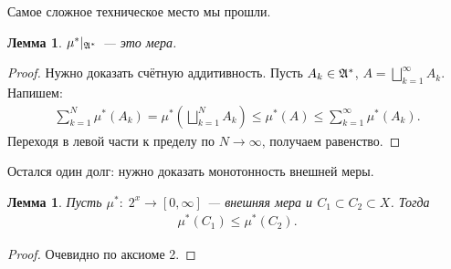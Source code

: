 \documentclass[a4paper,14pt]{extarticle}
\newcounter{theoremCnt}
\theoremstyle{definition}
\theoremstyle{plain}
\theoremstyle{plain}
\newtheorem{lm}[theoremCnt]{Лемма}
\theoremstyle{plain}
\theoremstyle{plain}
\theoremstyle{definition}
\theoremstyle{definition}
\theoremstyle{definition}
\theoremstyle{definition}
\theoremstyle{definition}
\theoremstyle{definition}
\theoremstyle{plain}
\theoremstyle{plain}
\theoremstyle{plain}
\theoremstyle{plain}
\theoremstyle{definition}
\theoremstyle{definition}
\theoremstyle{definition}
\theoremstyle{definition}
\theoremstyle{definition}
\newcommand{\A}{\ensuremath \mathfrak{A}}
\begin{document}
Самое сложное техническое место мы прошли.
\begin{lm}
 $ \mu^\ast \rvert_{\A^\ast} $ --- это мера.
\end{lm}
\begin{proof}
 Нужно доказать счётную аддитивность. Пусть $ A_k \in \A^\ast $, $ A = \bigsqcup_{k=1}^\infty A_k $. Напишем:
 \begin{align*}
  \sum_{k=1}^{N} \mu^\ast(A_k) = \mu^\ast\left( \bigsqcup_{k=1}^N A_k \right) \leqslant \mu^\ast(A) \leqslant \sum_{k=1}^{\infty}  \mu^\ast(A_k)
  .\end{align*} Переходя в левой части к пределу по $ N \to \infty $, получаем равенство.
\end{proof}
Остался один долг: нужно доказать монотонность внешней меры.
\begin{lm}
 Пусть $ \mu^\ast \colon\; 2^x \to [0, \infty] $ --- внешняя мера и $ C_1 \subset C_2 \subset X $. Тогда
 \begin{align*}
  \mu^\ast(C_1) \leqslant \mu^\ast(C_2)
  .\end{align*}
\end{lm}
\begin{proof}
 Очевидно по аксиоме 2.
\end{proof}
\end{document}
